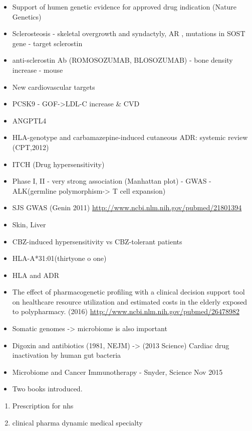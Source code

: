 \documentclass[]{book}
\providecommand{\tightlist}{%
  \setlength{\itemsep}{0pt}\setlength{\parskip}{0pt}}
\begin{document}
\begin{itemize}
\tightlist
\item
  Support of humen genetic evidence for approved drug indication (Nature
  Genetics)
\item
  Sclerosteosis - skeletal overgrowth and syndactyly, AR , mutations in
  SOST gene - target sclerostin
\item
  anti-sclerostin Ab (ROMOSOZUMAB, BLOSOZUMAB) - bone density increase -
  mouse
\item
  New cardiovascular targets
\item
  PCSK9 - GOF-\textgreater{}LDL-C increase \& CVD
\item
  ANGPTL4
\item
  HLA-genotype and carbamazepine-induced cutaneous ADR: systemic review
  (CPT,2012)
\item
  ITCH (Drug hypersensitivity)
\item
  Phase I, II - very strong association (Manhattan plot) - GWAS -
  ALK(germline polymorphism-\textgreater{} T cell expansion)
\item
  SJS GWAS (Genin 2011)
  \url{http://www.ncbi.nlm.nih.gov/pubmed/21801394}
\item
  Skin, Liver
\item
  CBZ-induced hypersensitivity vs CBZ-tolerant patients
\item
  HLA-A*31:01(thirtyone o one)
\item
  HLA and ADR
\item
  The effect of pharmacogenetic profiling with a clinical decision
  support tool on healthcare resource utilization and estimated costs in
  the elderly exposed to polypharmacy. (2016)
  \url{http://www.ncbi.nlm.nih.gov/pubmed/26478982}
\item
  Somatic genomes -\textgreater{} microbiome is also important
\item
  Digoxin and antibiotics (1981, NEJM) -\textgreater{} (2013 Science)
  Cardiac drug inactivation by human gut bacteria
\item
  Microbiome and Cancer Immunotherapy - Snyder, Science Nov 2015
\item
  Two books introduced.
\end{itemize}

\begin{enumerate}
\def\labelenumi{\arabic{enumi}.}
\tightlist
\item
  Prescription for nhs
\item
  clinical pharma dynamic medical specialty
\end{enumerate}
\end{document}
